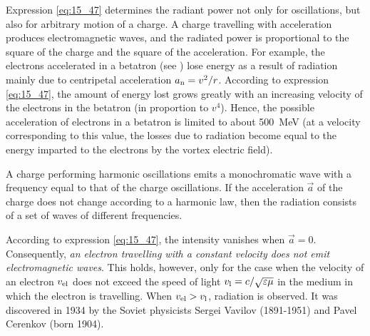 \noindent
Expression \eqref{eq:15_47} determines the radiant power not only for oscillations, but also for arbitrary motion of a charge.
A charge travelling with acceleration produces electromagnetic waves, and the radiated power is proportional to the square of the charge and the
square of the acceleration.
For example, the electrons accelerated in a betatron (see ) lose energy as a result of radiation mainly due to centripetal acceleration $a_{\text{n}}=v^2/r$.
According to expression \eqref{eq:15_47}, the amount of energy lost grows greatly with an increasing velocity of the electrons in the betatron (in proportion to $v^4$).
Hence, the possible acceleration of electrons in a betatron is limited to about \SI{500}{\mega\electronvolt} (at a velocity corresponding to this value, the losses due to radiation become equal to the energy imparted to the electrons by the vortex electric field).

A charge performing harmonic oscillations emits a monochromatic wave with a frequency equal to that of the charge oscillations.
If the acceleration $\vec{a}$ of the charge does not change according to a harmonic law, then the radiation consists of a set of waves of different
frequencies.

According to expression \eqref{eq:15_47}, the intensity vanishes when $\vec{a}=0$.
Consequently, \textit{an electron travelling with a constant velocity does not emit electromagnetic waves}.
This holds, however, only for the case when the velocity of an electron $v_{\text{el}}$ does not exceed the speed of light $v_{\text{l}}=c/\sqrt{\varepsilon\mu}$ in the medium in which the electron is travelling.
When $v_{\text{el}}>v_{\text{l}}$, radiation is observed.
It was discovered in 1934 by the Soviet physicists Sergei Vavilov (1891-1951) and Pavel Cerenkov (born 1904).

